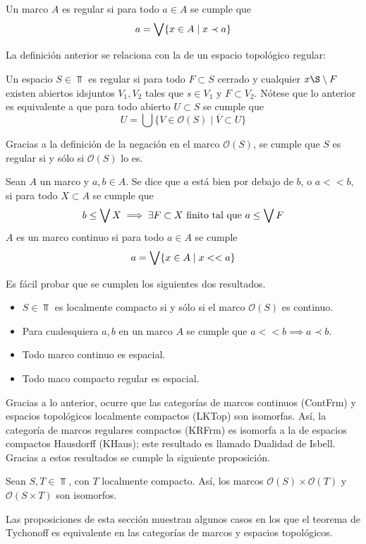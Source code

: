 \begin{defn}
Un marco $A$ es regular si para todo $a\in A$ se cumple que
$$a=\bigvee\{x\in A \mid x\prec a\}$$
\end{defn}
La definición anterior se relaciona con la de un espacio topológico regular:
\begin{defn}
    Un espacio $S\in\Top$ es regular si para todo $F\subset S$ cerrado y cualquier $x\S\setminus F$ existen abiertos idsjuntos $V_1, V_2$ tales que $s\in V_1$ y $F\subset V_2$.
    Nótese que lo anterior es equivalente a que para todo abierto $U\subset S$ se cumple que
    $$U=\bigcup \{V \in \mathcal{O}(S) \mid \overline{V}\subset U\}$$
\end{defn}
Gracias a la definición de la negación en el marco $\mathcal{O}(S)$, se cumple que $S$ es regular si y sólo si $\mathcal{O}(S)$ lo es.
\begin{defn}
    Sean $A$ un marco y $a,b\in A$. Se dice que $a$ está bien por debajo de $b$, o $a<<b$, si para todo $X\subset A$ se cumple que
    $$b\leq \bigvee X\implies \exists F\subset X \ \text{finito tal que} \ a\leq \bigvee F$$
    $A$ es un marco continuo si para todo $a\in A$ se cumple
    $$a=\bigvee\{x\in A\mid x<<a\}$$
\end{defn}
Es fácil probar que se cumplen los siguientes dos resultados.
\begin{lemma}
\begin{itemize}
    \item $S\in\Top$ es localmente compacto si y sólo si el marco $\mathcal{O}(S)$ es continuo.
    \item Para cualesquiera $a,b$ en un marco $A$ se cumple que $a<<b\implies a\prec b$.
    \item Todo marco continuo es espacial.
    \item Todo maco compacto regular es espacial.
\end{itemize}
\end{lemma}
Gracias a lo anterior, ocurre que las categorías de marcos continuos (ContFrm) y espacios topológicos localmente compactos (LKTop) son isomorfas. Así, la categoría de marcos regulares compactos (KRFrm) es isomorfa a la de espacios compactos Hausdorff (KHaus); este resultado es llamado Dualidad de Isbell.
Gracias a estos resultados se cumple la siguiente proposición.
\begin{prop}
Sean $S,T\in\Top$, con $T$ localmente compacto. Así, los marcos $\mathcal{O}(S)\times \mathcal{O}(T)$ y $\mathcal{O}(S\times T)$ son isomorfos.
\end{prop}
Las proposiciones de esta sección muestran algunos casos en los que el teorema de Tychonoff es equivalente en las categorías de marcos y espacios topológicos.

